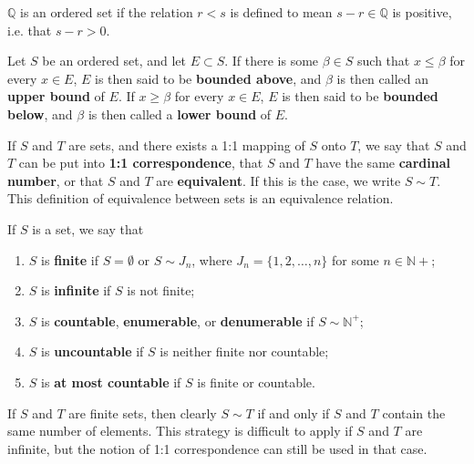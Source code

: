 \documentclass[12pt]{article}
\begin{document}
\begin{exm}
  $\mathbb{Q}$ is an ordered set if the relation $r < s$ is defined to mean $s - r
  \in \mathbb{Q}$ is positive, i.e. that $s - r > 0$.
\end{exm}

\begin{defn}
  Let $S$ be an ordered set, and let $E \subset S$. If there is some $\beta \in S$
  such that $x \leq \beta$ for every $x \in E$, $E$ is then said to be
  \textbf{bounded above}, and $\beta$ is then called an \textbf{upper bound} of $E$.
  If $x \geq \beta$ for every $x \in E$, $E$ is then said to be \textbf{bounded
  below}, and $\beta$ is then called a \textbf{lower bound} of $E$.
\end{defn}

\begin{defn}
  If $S$ and $T$ are sets, and there exists a 1:1 mapping of $S$ onto $T$, we say
  that $S$ and $T$ can be put into \textbf{1:1 correspondence}, that $S$ and $T$ have
  the same \textbf{cardinal number}, or that $S$ and $T$ are \textbf{equivalent}. If
  this is the case, we write $S \sim T$. This definition of equivalence between sets
  is an equivalence relation.
\end{defn}

\begin{defn}
  If $S$ is a set, we say that
  \begin{enumerate}
    \item
      $S$ is \textbf{finite} if $S = \emptyset$ or $S \sim J_n$, where $J_n =
      \{1,2,\ldots,n\}$ for some $n \in \mathbb{N}+$;
    \item
      $S$ is \textbf{infinite} if $S$ is not finite;
    \item
      $S$ is \textbf{countable}, \textbf{enumerable}, or \textbf{denumerable} if $S
      \sim \mathbb{N}^+$;
    \item
      $S$ is \textbf{uncountable} if $S$ is neither finite nor countable;
    \item
      $S$ is \textbf{at most countable} if $S$ is finite or countable.
  \end{enumerate}
\end{defn}

\begin{comm}
  If $S$ and $T$ are finite sets, then clearly $S \sim T$ if and only if $S$ and $T$
  contain the same number of elements. This strategy is difficult to apply if $S$ and
  $T$ are infinite, but the notion of 1:1 correspondence can still be used in that
  case.
\end{comm}
\end{document}
